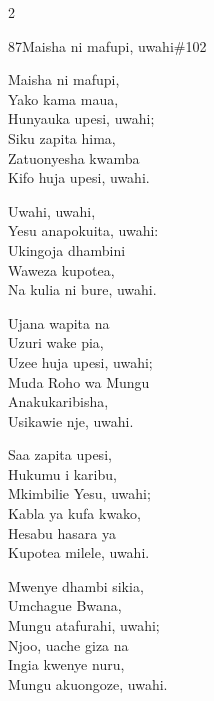 \documentclass{article}
\begin{document}
\begin{multicols}{2}
\begin{hymn}{87}{Maisha ni mafupi, uwahi}{\#102}
\begin{stanza}
Maisha ni mafupi,\\
Yako kama maua,\\
Hunyauka upesi, uwahi;\\
Siku zapita hima,\\
Zatuonyesha kwamba\\
Kifo huja upesi, uwahi.
\end{stanza}
\begin{chorus}
Uwahi, uwahi,\\
Yesu anapokuita, uwahi:\\
Ukingoja dhambini\\
Waweza kupotea,\\
Na kulia ni bure, uwahi.
\end{chorus}
\begin{stanza}
Ujana wapita na\\
Uzuri wake pia,\\
Uzee huja upesi, uwahi;\\
Muda Roho wa Mungu\\
Anakukaribisha,\\
Usikawie nje, uwahi.
\end{stanza}
\begin{stanza}
Saa zapita upesi,\\
Hukumu i karibu,\\
Mkimbilie Yesu, uwahi;\\
Kabla ya kufa kwako,\\
Hesabu hasara ya\\
Kupotea milele, uwahi.
\end{stanza}
\begin{stanza}
Mwenye dhambi sikia,\\
Umchague Bwana,\\
Mungu atafurahi, uwahi;\\
Njoo, uache giza na\\
Ingia kwenye nuru,\\
Mungu akuongoze, uwahi.
\end{stanza}
\end{hymn}


\end{multicols}
\end{document}
